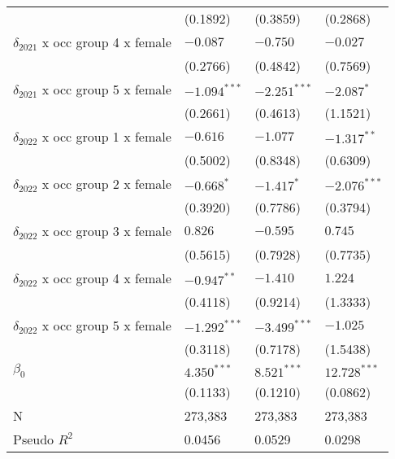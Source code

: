 \begin{tabular}{llll}
                                       &           (0.1892) &           (0.3859) &           (0.2868) \\
$\delta_{2021}$ x occ group 4 x female &           $-0.087$ &           $-0.750$ &           $-0.027$ \\
                                       &           (0.2766) &           (0.4842) &           (0.7569) \\
$\delta_{2021}$ x occ group 5 x female &     $-1.094^{***}$ &     $-2.251^{***}$ &         $-2.087^*$ \\
                                       &           (0.2661) &           (0.4613) &           (1.1521) \\
$\delta_{2022}$ x occ group 1 x female &           $-0.616$ &           $-1.077$ &      $-1.317^{**}$ \\
                                       &           (0.5002) &           (0.8348) &           (0.6309) \\
$\delta_{2022}$ x occ group 2 x female &         $-0.668^*$ &         $-1.417^*$ &     $-2.076^{***}$ \\
                                       &           (0.3920) &           (0.7786) &           (0.3794) \\
$\delta_{2022}$ x occ group 3 x female &            $0.826$ &           $-0.595$ &            $0.745$ \\
                                       &           (0.5615) &           (0.7928) &           (0.7735) \\
$\delta_{2022}$ x occ group 4 x female &      $-0.947^{**}$ &           $-1.410$ &            $1.224$ \\
                                       &           (0.4118) &           (0.9214) &           (1.3333) \\
$\delta_{2022}$ x occ group 5 x female &     $-1.292^{***}$ &     $-3.499^{***}$ &           $-1.025$ \\
                                       &           (0.3118) &           (0.7178) &           (1.5438) \\
$\beta_0$                              &      $4.350^{***}$ &      $8.521^{***}$ &     $12.728^{***}$ \\
                                       &           (0.1133) &           (0.1210) &           (0.0862) \\
N                                      &            273,383 &            273,383 &            273,383 \\
Pseudo $R^2$                           &             0.0456 &             0.0529 &             0.0298 \\
\bottomrule
\end{tabular}
